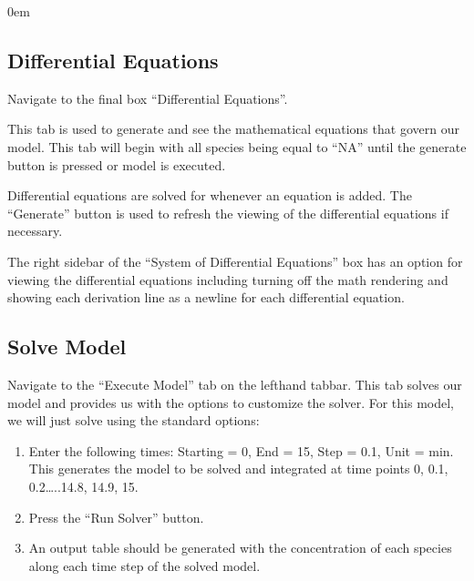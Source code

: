 \documentclass[letterpaper,10pt,english]{sphinxmanual}
\begin{document}
\begin{DUlineblock}{0em}
\item[] 
\end{DUlineblock}


\subsection{Differential Equations}
\label{\detokenize{pages/tutorial_sc/diffeqns:differential-equations}}\label{\detokenize{pages/tutorial_sc/diffeqns::doc}}
\sphinxAtStartPar
Navigate to the final box “Differential Equations”.

\sphinxAtStartPar
This tab is used to generate and see the mathematical equations that govern
our model.  This tab will begin with all species being equal to “NA” until the
generate button is pressed or model is executed.

\sphinxAtStartPar
Differential equations are solved for whenever an equation is added.
The “Generate” button is used to refresh the viewing of the differential
equations if necessary.

\begin{figure}[htbp]
\centering

\noindent{}
\end{figure}

\sphinxAtStartPar
{} The right sidebar of the “System of Differential Equations” box has an
option for viewing the differential equations including turning off the math
rendering and showing each derivation line as a newline for each differential
equation.


\subsection{Solve Model}
\label{\detokenize{pages/tutorial_sc/executemodel:solve-model}}\label{\detokenize{pages/tutorial_sc/executemodel::doc}}
\sphinxAtStartPar
Navigate to the “Execute Model” tab on the lefthand tabbar. This tab solves our
model and provides us with the options to customize the solver. For this model,
we will just solve using the standard options:
\begin{enumerate}
%
\item {} 
\sphinxAtStartPar
Enter the following times: Starting = 0, End = 15, Step = 0.1, Unit = min.
This generates the model to be solved and integrated at time points 0, 0.1,
0.2…..14.8, 14.9, 15.

\item {} 
\sphinxAtStartPar
Press the “Run Solver” button.

\item {} 
\sphinxAtStartPar
An output table should be generated with the concentration of each species
along each time step of the solved model.

\end{enumerate}
\end{document}
